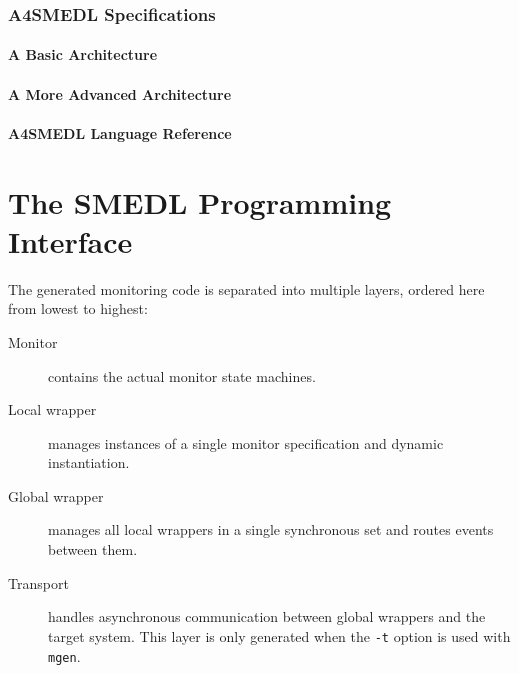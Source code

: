 \documentclass[paper=letter,titlepage,captions=tableheading]{scrartcl}
\begin{document}
\section{A4SMEDL Specifications}
\label{sec:a4smedl}

\subsection{A Basic Architecture}
\label{subsec:a4smedl-basic}

\subsection{A More Advanced Architecture}
\label{subsec:a4smedl-advanced}

\subsection{A4SMEDL Language Reference}
\label{subsec:a4smedl-ref}





\clearpage
\part{The SMEDL Programming Interface}
\label{part:api}

The generated monitoring code is separated into multiple layers, ordered here
from lowest to highest:
\begin{description}
  \item[Monitor] contains the actual monitor state machines.
  \item[Local wrapper] manages instances of a single monitor specification and
    dynamic instantiation.
  \item[Global wrapper] manages all local wrappers in a single synchronous set
    and routes events between them.
  \item[Transport] handles asynchronous communication between global wrappers
    and the target system. This layer is only generated when the \texttt{-t}
    option is used with \texttt{mgen}.
\end{description}
\end{document}

